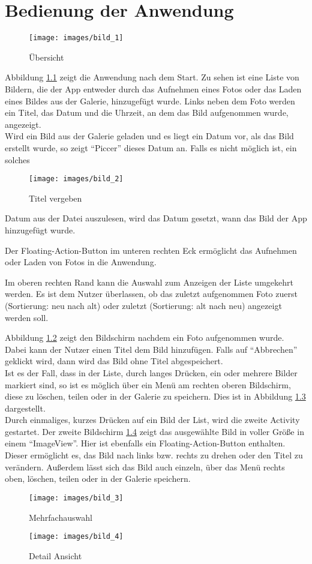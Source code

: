
\chapter{Bedienung der Anwendung}
\begin{figure}[H]
\label{Bild1}
\centering
\texttt{[image: images/bild\_1]}
\caption{Übersicht}
\end{figure}
Abbildung \ref{Bild1} zeigt die Anwendung nach dem Start. Zu sehen ist eine Liste von Bildern, die der App entweder durch das Aufnehmen eines Fotos oder das Laden eines Bildes
aus der Galerie, hinzugefügt wurde. Links neben dem Foto werden ein Titel, das Datum und die Uhrzeit, an dem das Bild aufgenommen wurde, angezeigt. \\
Wird ein Bild aus der Galerie geladen und es liegt ein Datum vor, als das Bild erstellt wurde, so zeigt \enquote{Piccer} dieses Datum an. Falls es nicht möglich ist, ein solches
\begin{figure}[H]
\label{Bild2}
\centering
\texttt{[image: images/bild\_2]}
\caption{Titel vergeben}
\end{figure}
Datum aus der Datei auszulesen, wird das Datum gesetzt, wann das Bild der App hinzugefügt wurde.

Der Floating-Action-Button im unteren rechten Eck ermöglicht das Aufnehmen oder Laden von Fotos in die Anwendung.

Im oberen rechten Rand kann die Auswahl zum Anzeigen der Liste umgekehrt werden. Es ist dem Nutzer überlassen, ob das zuletzt aufgenommen Foto zuerst (Sortierung: neu nach alt) oder zuletzt (Sortierung: alt nach neu) angezeigt werden soll.


Abbildung \ref{Bild2} zeigt den Bildschirm nachdem ein Foto aufgenommen wurde.
Dabei kann der Nutzer einen Titel dem Bild hinzufügen. Falls auf \enquote{Abbrechen}
 geklickt wird, dann wird das Bild ohne Titel abgespeichert.\\

Ist es der Fall, dass in der Liste, durch langes Drücken, ein oder mehrere Bilder markiert sind, so ist es möglich über ein Menü am rechten oberen Bildschirm, diese zu löschen, teilen oder in der Galerie zu speichern. Dies ist in Abbildung \ref{Bild3} dargestellt.\\

Durch einmaliges, kurzes Drücken auf ein Bild der List, wird die zweite Activity
gestartet. Der zweite Bildschirm \ref{Bild4} zeigt das ausgewählte Bild in voller Größe in einem \enquote{ImageView}. Hier ist ebenfalls ein Floating-Action-Button enthalten. Dieser ermöglicht es, das Bild nach links bzw. rechts zu drehen oder den Titel zu verändern.
Außerdem lässt sich das Bild auch einzeln, über das Menü rechts oben, löschen, teilen oder in der Galerie speichern.

\begin{figure}[H]
\label{Bild3}
\centering
\texttt{[image: images/bild\_3]}
\caption{Mehrfachauswahl}
\end{figure} 


\begin{figure}[H]
\label{Bild4}
\begin{center}
\texttt{[image: images/bild\_4]}
\end{center}

\caption{Detail Ansicht}
\end{figure}


